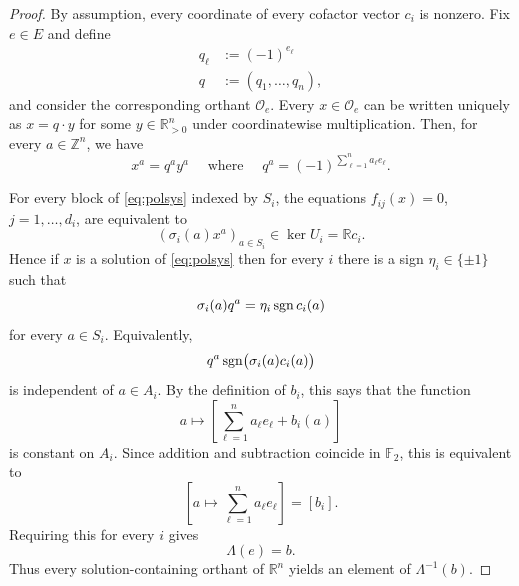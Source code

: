 \documentclass[a4paper]{article}
\theoremstyle{remark}
\def\RR{\mathbb{R}}
\def\ZZ{\mathbb{Z}}
\newcommand{\sgn}{\mathop{\rm sgn}\nolimits}
\begin{document}
\begin{proof}
  By assumption, every coordinate of every cofactor vector $c_i$ is
  nonzero. Fix $e\in E$ and define
  \begin{align*}
    q_\ell&:=(-1)^{e_\ell}\\
    q&:=(q_1,\ldots,q_n),
  \end{align*}
  and consider the corresponding orthant $\mathcal O_e$. Every
  $x\in\mathcal O_e$ can be written uniquely as $x = q\cdot y$ for some
  $y\in\RR_{>0}^n$ under coordinatewise multiplication. Then, for every
  $a\in \ZZ^n$, we have
  \[x^a = q^ay^a\quad \text{ where }\quad q^a=(-1)^{\sum_{\ell=1}^n a_\ell e_\ell}.\]

  For every block of \eqref{eq:polsys} indexed by $S_i$, the equations
  $f_{ij}(x)=0$, $j=1,\ldots,d_i$, are equivalent to
  $$
  \left(\sigma_i(a)x^a\right)_{a\in S_i}\in\ker U_i=\RR c_i.
  $$
  Hence if $x$ is a solution of \eqref{eq:polsys} then for every $i$
  there is a sign $\eta_i\in\{\pm1\}$ such that
  $$
  \sigma_i(a)q^a
  =
  \eta_i\sgn c_i(a)
  $$
  for every $a\in S_i$. Equivalently,
  $$
  q^a\sgn\bigl(\sigma_i(a)c_i(a)\bigr)
  $$
  is independent of $a\in A_i$.
  By the definition of $b_i$, this says that the function
  $$
  a\longmapsto \left[\sum_{\ell=1}^n a_\ell e_\ell+b_i(a)\right]
  $$
  is constant on $A_i$. Since addition and subtraction coincide in
  $\mathbb F_2$, this is equivalent to
  $$
  \left[
    a\longmapsto\sum_{\ell=1}^n a_\ell e_\ell
  \right]
  =
  [b_i].
  $$
  Requiring this for every $i$ gives
  $$
  \Lambda(e)=b.
  $$
  Thus every solution-containing orthant of $\RR^n$ yields an
  element of $\Lambda^{-1}(b)$.


\end{proof}
\end{document}
